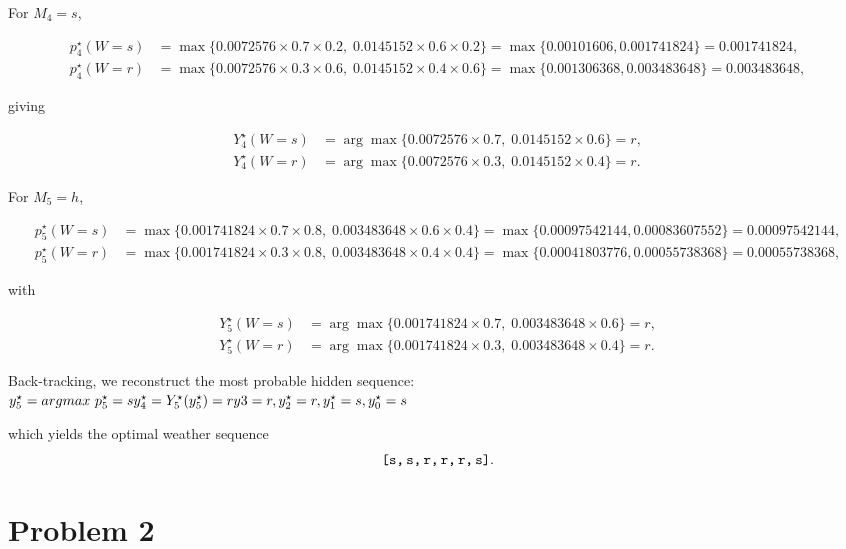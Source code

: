 For $M_4=s$,

\[
\begin{aligned}
p^\star_4(W=s)&=\max\bigl\{0.0072576\times0.7\times0.2,\;0.0145152\times0.6\times0.2\bigr\}
               =\max\{0.00101606,0.001741824\}=0.001741824,\\
p^\star_4(W=r)&=\max\bigl\{0.0072576\times0.3\times0.6,\;0.0145152\times0.4\times0.6\bigr\}
               =\max\{0.001306368,0.003483648\}=0.003483648,
\end{aligned}
\]

giving

\[
\begin{aligned}
Y^\star_4(W=s)&=\arg\max\{0.0072576\times0.7,\;0.0145152\times0.6\}=r,\\
Y^\star_4(W=r)&=\arg\max\{0.0072576\times0.3,\;0.0145152\times0.4\}=r.
\end{aligned}
\]

For $M_5=h$,

\[
\begin{aligned}
p^\star_5(W=s)&=\max\bigl\{0.001741824\times0.7\times0.8,\;0.003483648\times0.6\times0.4\bigr\}
               =\max\{0.00097542144,0.00083607552\}=0.00097542144,\\
p^\star_5(W=r)&=\max\bigl\{0.001741824\times0.3\times0.8,\;0.003483648\times0.4\times0.4\bigr\}
               =\max\{0.00041803776,0.00055738368\}=0.00055738368,
\end{aligned}
\]

with

\[
\begin{aligned}
Y^\star_5(W=s)&=\arg\max\{0.001741824\times0.7,\;0.003483648\times0.6\}=r,\\
Y^\star_5(W=r)&=\arg\max\{0.001741824\times0.3,\;0.003483648\times0.4\}=r.
\end{aligned}
\]

Back-tracking, we reconstruct the most probable hidden sequence: \\
{\color{purple}
\begin{math}
y^\star_5 = argmax\ p^\star_5 = s \\
y^\star_4 = Y^\star_5(y^\star_5) = r \\
y3 = r, y^\star_2 = r,y^\star_1 = s,y^\star_0 = s
\end{math}
}

which yields the optimal weather sequence
\[
\texttt{[s,\,s,\,r,\,r,\,r,\,s]}.
\]




\section*{Problem 2}

